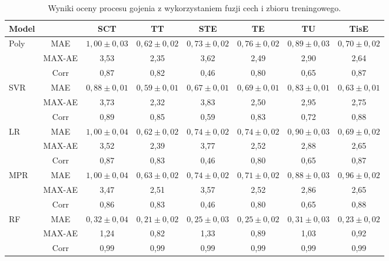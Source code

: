 \begin{table}[]
	\caption{Wyniki oceny procesu gojenia z wykorzystaniem fuzji cech i zbioru treningowego.}
	\scriptsize
	\begin{center}
		\begin{tabular}{lc||c|c|c|c|c|c}
			\textbf{Model} & & \textbf{SCT} & \textbf{TT} & \textbf{STE} & \textbf{TE} & \textbf{TU} & \textbf{TisE}\\ 
			
			\hline \hline
			\multirow{3}{*}{Poly}
			& MAE & $1,00\pm0,03$ & $0,62\pm0,02$ & $0,73\pm0,02$ & $0,76\pm0,02$ & $0,89\pm0,03$ & $0,70\pm0,02$\\
			& MAX-AE & 3,53 & 2,35 & 3,62 & 2,49 & 2,90 & 2,64 \\
			& Corr   & 0,87 & 0,82 & 0,46 & 0,80 & 0,65 & 0,87 \\
			\hline
			\multirow{3}{*}{SVR}
			& MAE & $0,88\pm0,01$ & $0,59\pm0,01$ & $0,67\pm0,01$ & $0,69\pm0,01$ & $0,83\pm0,01$ & $0,63\pm0,01$\\
			& MAX-AE & 3,73 & 2,32 & 3,83 & 2,50 & 2,95 & 2,75 \\
			& Corr   & 0,89 & 0,85 & 0,59 & 0,83 & 0,72 & 0,88 \\
			\hline
			\multirow{3}{*}{LR}
			& MAE & $1,00\pm0,04$ & $0,62\pm0,02$ & $0,74\pm0,02$ & $0,74\pm0,02$ & $0,90\pm0,03$ & $0,69\pm0,02$\\
			& MAX-AE & 3,52 & 2,39 & 3,77 & 2,52 & 2,88 & 2,65 \\
			& Corr   & 0,87 & 0,83 & 0,46 & 0,80 & 0,65 & 0,87 \\
			\hline
			\multirow{3}{*}{MPR}
			& MAE & $1,00\pm0,04$ & $0,63\pm0,02$ & $0,74\pm0,02$ & $0,71\pm0,02$ & $0,88\pm0,03$ & $0,96\pm0,02$\\
			& MAX-AE & 3,47 & 2,51 & 3,57 & 2,52 & 2,86 & 2,65 \\
			& Corr   & 0,86 & 0,83 & 0,46 & 0,80 & 0,65 & 0,88 \\
			\hline
			 \multirow{3}{*}{RF}
			 & MAE & $0,32\pm0,04$ & $0,21\pm0,02$ & $0,25\pm0,03$ & $0,25\pm0,02$ & $0,31\pm0,03$ & $0,23\pm0,02$\\
			 & MAX-AE & 1,24 & 0,82 & 1,33 & 0,89 & 1,03 & 0,92 \\
			 & Corr   & 0,99 & 0,99 & 0,99 & 0,99 & 0,99 & 0,99 \\
			 \hline
		\end{tabular}
	\end{center}
	\label{tab:trainset}
\end{table}

